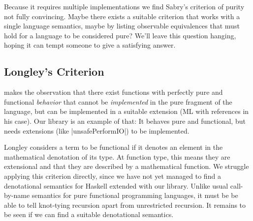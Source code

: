\documentclass[manuscript,screen,acmsmall,nonacm]{acmart}
\begin{document}
Because it requires multiple implementations we find Sabry’s criterion of purity not fully convincing. Maybe there exists a suitable criterion that works with a single language semantics, maybe by listing observable equivalences that must hold for a language to be considered pure?
We'll leave this question hanging, hoping it can tempt someone to give a satisfying answer.

\subsection{Longley’s Criterion}

 makes the observation that there exist functions with perfectly pure and functional \emph{behavior} that cannot be \emph{implemented} in the pure fragment of the language, but can be implemented in a suitable extension (ML with references in his case). Our library is an example of that: It behaves pure and functional, but needs extensions (like |unsafePerformIO|) to be implemented.

Longley considers a term to be functional if it denotes an element in the mathematical denotation of its type. At function type, this means they are extensional and that they are described by a mathematical function. We struggle applying this criterion directly, since we have not yet managed to find a denotational semantics for Haskell extended with our library. Unlike usual call-by-name semantics for pure functional programming languages, it must be be able to tell knot-tying recursion apart from unrestricted recursion. It remains to be seen if we can find a suitable denotational semantics.

\fi



\end{document}
